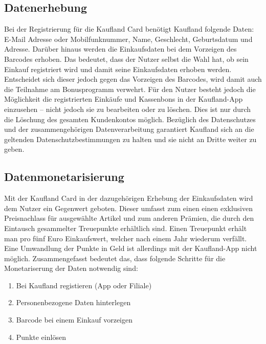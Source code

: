 \subsection{Datenerhebung}
Bei der Registrierung für die Kaufland Card benötigt Kaufland folgende Daten: E-Mail Adresse oder Mobilfunknummer, Name, Geschlecht, Geburtsdatum und Adresse. Darüber hinaus werden die Einkaufsdaten bei dem Vorzeigen des Barcodes erhoben. Das bedeutet, dass der Nutzer selbst die Wahl hat, ob sein Einkauf registriert wird und damit seine Einkaufsdaten erhoben werden. Entscheidet sich dieser jedoch gegen das Vorzeigen des Barcodes, wird damit auch die Teilnahme am Bonusprogramm verwehrt. Für den Nutzer besteht jedoch die Möglichkeit die registrierten Einkäufe und Kassenbons in der Kaufland-App einzusehen -- nicht jedoch sie zu bearbeiten oder zu löschen. Dies ist nur durch die Löschung des gesamten Kundenkontos möglich. \cite{Kaufland_FAQ} Bezüglich des Datenschutzes und der zusammengehörigen Datenverarbeitung garantiert Kaufland sich an die geltenden Datenschutzbestimmungen zu halten und sie nicht an Dritte weiter zu geben. \cite{Kaufland_Rechtliches} 

\subsection{Datenmonetarisierung}
Mit der Kaufland Card in der dazugehörigen Erhebung der Einkaufsdaten wird dem Nutzer ein Gegenwert geboten. Dieser umfasst zum einen einen exklusiven Preisnachlass für ausgewählte Artikel und zum anderen Prämien, die durch den Eintausch gesammelter Treuepunkte erhältlich sind. Einen Treuepunkt erhält man pro fünf Euro Einkaufswert, welcher nach einem Jahr wiederum verfällt. Eine Umwandlung der Punkte in Geld ist allerdings mit der Kaufland-App nicht möglich. \cite{Kaufland_FAQ} Zusammengefasst bedeutet das, dass folgende Schritte für die Monetariserung der Daten notwendig sind:

\begin{enumerate}
	\item Bei Kaufland registieren (App oder Filiale) 
	\item Personenbezogene Daten hinterlegen
	\item Barcode bei einem Einkauf vorzeigen
	\item Punkte einlösen
\end{enumerate}
